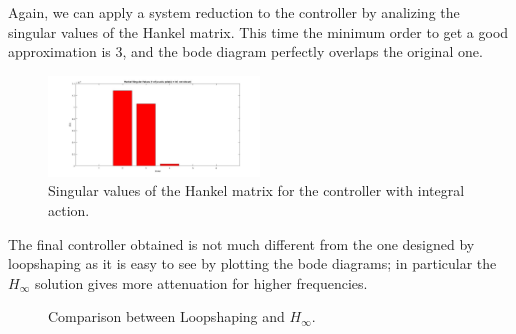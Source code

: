 Again, we can apply a system reduction to the controller by analizing the singular values of the Hankel matrix. This time the minimum order to get a good approximation is 3, and the bode diagram perfectly overlaps the original one.\\

\begin{figure}[h]
\centering
\includegraphics[width=0.5\textwidth]{img/hinf_hankel_int.jpg}
\caption{Singular values of the Hankel matrix for the controller with integral action.}
\end{figure}

The final controller obtained is not much different from the one designed by loopshaping as it is easy to see by plotting the bode diagrams; in particular the $H_\infty$ solution gives more attenuation for higher frequencies.\\

  \begin{figure}[h]
  \centering
  \hfill
\caption{Comparison between Loopshaping and $H_{\infty}$.}
\end{figure}

